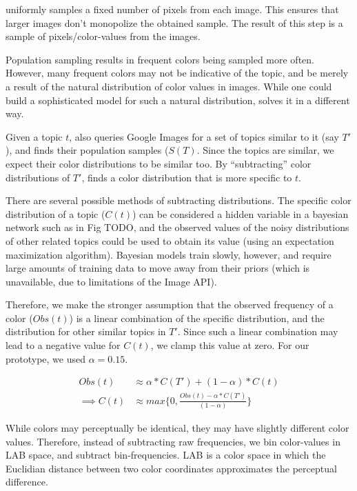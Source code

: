 \system uniformly samples a fixed number of pixels from each image. This ensures that larger images don't monopolize the obtained sample. The result of this step is a sample of pixels/color-values from the images.

Population sampling results in frequent colors being sampled more often. However, many frequent colors may not be indicative of the topic, and be merely a result of the natural distribution of color values in images. While one could build a sophisticated model for such a natural distribution, \system solves it in a different way.

Given a topic $t$, \system also queries Google Images for a set of topics similar to it (say $T'$), and finds their population samples ($S(T)$. Since the topics are similar, we expect their color distributions to be similar too. By ``subtracting'' color distributions of $T'$, \system finds a color distribution that is more specific to $t$. 

There are several possible methods of subtracting distributions. The specific color distribution of a topic ($C(t)$) can be considered a hidden variable in a bayesian network such as in Fig TODO, and the observed values of the noisy distributions of other related topics could be used to obtain its value (using an expectation maximization algorithm). Bayesian models train slowly, however, and require large amounts of training data to move away from their priors (which is unavailable, due to limitations of the Image API).

Therefore, we make the stronger assumption that the observed frequency of a color ($Obs(t)$) is a linear combination of the specific distribution, and the distribution for other similar topics in $T'$. Since such a linear combination may lead to a negative value for $C(t)$, we clamp this value at zero. For our prototype, we used $\alpha = 0.15$.

\begin{align}
\label{linear-color}
Obs(t) &\approx \alpha*C(T') + (1-\alpha)*C(t) \\
\implies  C(t) &\approx max\{0,\frac{Obs(t) - \alpha*C(T')}{(1-\alpha)}\}
\end{align}


While colors may perceptually be identical, they may have slightly different color values. Therefore, instead of subtracting raw frequencies, we bin color-values in LAB space, and subtract bin-frequencies. LAB is a color space in which the Euclidian distance between two color coordinates approximates the perceptual difference. 


